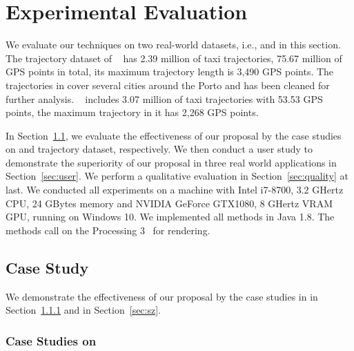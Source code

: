 \section{Experimental Evaluation}\label{sec:exp}
We evaluate our techniques on two real-world datasets, i.e., \pt{} and \sz{} in this section.
The trajectory dataset of \pt{}~\cite{pt} has 2.39 million of taxi trajectories, 75.67 million of GPS points in total, its maximum trajectory length is 3,490 GPS points.
The trajectories in \pt{} cover several cities around the Porto and has been cleaned for further analysis.
\sz{}~\cite{sz} includes 3.07 million of taxi trajectories with 53.53 GPS points, the maximum trajectory in it has 2,268 GPS points.

In Section~\ref{sec:case}, we evaluate the effectiveness of our proposal by the case studies on \pt{} and \sz{} trajectory dataset, respectively.
We then conduct a user study to demonstrate the superiority of our proposal in three real world applications in Section~\ref{sec:user}.
We perform a qualitative evaluation in Section~\ref{sec:quality} at last.
We conducted all experiments on a machine with Intel i7-8700, 3.2 GHertz CPU, 24 GBytes memory and NVIDIA GeForce GTX1080, 8 GHertz VRAM GPU, running on Windows 10.
We implemented all methods in Java 1.8. The methods call on the Processing 3~\cite{p3} for rendering.


\subsection{Case Study}\label{sec:case}

We demonstrate the effectiveness of our proposal by the case studies in \pt{} in Section~\ref{sec:pt} and \sz{} {in Section~\ref{sec:sz}}.

\subsubsection{Case Studies on \pt{}}\label{sec:pt}

